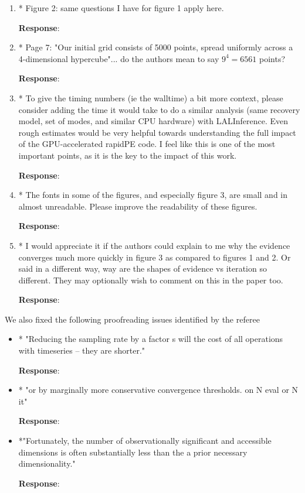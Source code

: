 \documentclass[onecolumn]{revtex4}
\begin{document}
\begin{enumerate}
\item * Figure 2: same questions I have for figure 1 apply here.

\noindent \textbf{Response}:

\item * Page 7: "Our initial grid consists of 5000 points, spread uniformly
across a 4-dimensional hypercube"... do the authors mean to say $9^4 =
6561$ points?

\noindent \textbf{Response}:

\item * To give the timing numbers (ie the walltime) a bit more context,
please consider adding the time it would take to do a similar analysis
(same recovery model, set of modes, and similar CPU hardware) with
LALInference. Even rough estimates would be very helpful towards
understanding the full impact of the GPU-accelerated rapidPE code. I
feel like this is one of the most important points, as it is the key
to the impact of this work.

\noindent \textbf{Response}:


\item * The fonts in some of the figures, and especially figure 3, are small
and in almost unreadable. Please improve the readability of these
figures.

\noindent \textbf{Response}:


\item * I would appreciate it if the authors could explain to me why the
evidence converges much more quickly in figure 3 as compared to
figures 1 and 2. Or said in a different way, way are the shapes of
evidence vs iteration so different. They may optionally wish to
comment on this in the paper too.

\noindent \textbf{Response}:

\end{enumerate}

We also fixed the following proofreading issues identified by the referee
\begin{itemize}


\item * "Reducing the sampling rate by a factor s will the cost of all
operations with timeseries – they are shorter."

\noindent \textbf{Response}:


\item * "or by marginally more conservative convergence thresholds. on N
eval or N it"

\noindent \textbf{Response}:

\item *"Fortunately, the number of observationally significant and
accessible dimensions is often substantially less than the a prior
necessary dimensionality."

\noindent \textbf{Response}:

\end{itemize}
\end{document}
